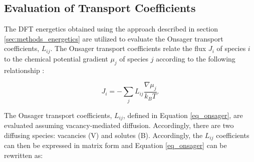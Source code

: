\documentclass[preprint,12pt]{elsarticle}
\begin{document}

\subsection{Evaluation of Transport Coefficients}

The DFT energetics obtained using the approach described in section \ref{sec:methods_energetics} are utilized to evaluate the Onsager transport coefficients, $L_{ij}$. The Onsager transport coefficients relate the flux $J_i$ of species $i$ to the chemical potential gradient $\mu_j$ of species $j$ according to the following relationship \citep{allnatt_atomic_2003}:

\begin{equation}
   J_i = -\sum_j{L_{ij} \frac{\nabla\mu_j}{k_B T}}. 
   \label{eq_onsager}
\end{equation}

The Onsager transport coefficients, $L_{ij}$, defined in Equation \ref{eq_onsager}, are evaluated assuming vacancy-mediated diffusion. Accordingly, there are two diffusing species: vacancies (V) and solutes (B). Accordingly, the $L_{ij}$ coefficients can then be expressed in matrix form and Equation \ref{eq_onsager} can be rewritten as:
\end{document}
